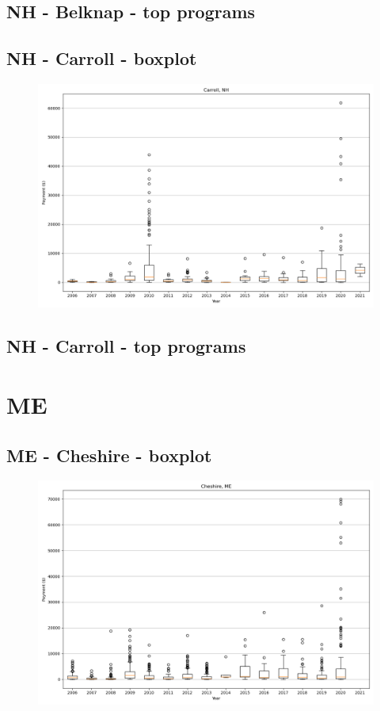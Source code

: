 \subsection*{NH - Belknap - top programs}

\newpage
\subsection*{NH - Carroll - boxplot}
\begin{figure}[h]
\centering
\includegraphics[width=7in]{../output/boxplots/counties/Carroll-NH_boxplot.png}
\end{figure}


\subsection*{NH - Carroll - top programs}

\newpage
\section*{ME}
\subsection*{ME - Cheshire - boxplot}
\begin{figure}[h]
\centering
\includegraphics[width=7in]{../output/boxplots/counties/Cheshire-ME_boxplot.png}
\end{figure}


